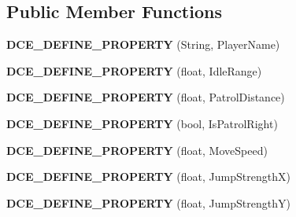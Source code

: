 \subsection*{Public Member Functions}
\begin{DoxyCompactItemize}
\item 
\hypertarget{classDCEngine_1_1Components_1_1Grunt_a0d5f3e19e82ab68d62b8fef4d9335e28}{{\bfseries D\-C\-E\-\_\-\-D\-E\-F\-I\-N\-E\-\_\-\-P\-R\-O\-P\-E\-R\-T\-Y} (String, Player\-Name)}\label{classDCEngine_1_1Components_1_1Grunt_a0d5f3e19e82ab68d62b8fef4d9335e28}

\item 
\hypertarget{classDCEngine_1_1Components_1_1Grunt_a43e84a3b4f21928fa86a934160e26d17}{{\bfseries D\-C\-E\-\_\-\-D\-E\-F\-I\-N\-E\-\_\-\-P\-R\-O\-P\-E\-R\-T\-Y} (float, Idle\-Range)}\label{classDCEngine_1_1Components_1_1Grunt_a43e84a3b4f21928fa86a934160e26d17}

\item 
\hypertarget{classDCEngine_1_1Components_1_1Grunt_ab9afd6d1611667b70f060617914939d5}{{\bfseries D\-C\-E\-\_\-\-D\-E\-F\-I\-N\-E\-\_\-\-P\-R\-O\-P\-E\-R\-T\-Y} (float, Patrol\-Distance)}\label{classDCEngine_1_1Components_1_1Grunt_ab9afd6d1611667b70f060617914939d5}

\item 
\hypertarget{classDCEngine_1_1Components_1_1Grunt_a40c60895b68ea313836fb03521e47877}{{\bfseries D\-C\-E\-\_\-\-D\-E\-F\-I\-N\-E\-\_\-\-P\-R\-O\-P\-E\-R\-T\-Y} (bool, Is\-Patrol\-Right)}\label{classDCEngine_1_1Components_1_1Grunt_a40c60895b68ea313836fb03521e47877}

\item 
\hypertarget{classDCEngine_1_1Components_1_1Grunt_af777d1d2206e0af78534adf6212a568b}{{\bfseries D\-C\-E\-\_\-\-D\-E\-F\-I\-N\-E\-\_\-\-P\-R\-O\-P\-E\-R\-T\-Y} (float, Move\-Speed)}\label{classDCEngine_1_1Components_1_1Grunt_af777d1d2206e0af78534adf6212a568b}

\item 
\hypertarget{classDCEngine_1_1Components_1_1Grunt_a575a1e3791e9cad674a70be0dfaf2c69}{{\bfseries D\-C\-E\-\_\-\-D\-E\-F\-I\-N\-E\-\_\-\-P\-R\-O\-P\-E\-R\-T\-Y} (float, Jump\-Strength\-X)}\label{classDCEngine_1_1Components_1_1Grunt_a575a1e3791e9cad674a70be0dfaf2c69}

\item 
\hypertarget{classDCEngine_1_1Components_1_1Grunt_a83ba839e6928d118c2b73b546bdf8ffb}{{\bfseries D\-C\-E\-\_\-\-D\-E\-F\-I\-N\-E\-\_\-\-P\-R\-O\-P\-E\-R\-T\-Y} (float, Jump\-Strength\-Y)}\label{classDCEngine_1_1Components_1_1Grunt_a83ba839e6928d118c2b73b546bdf8ffb}


\end{DoxyCompactItemize}
